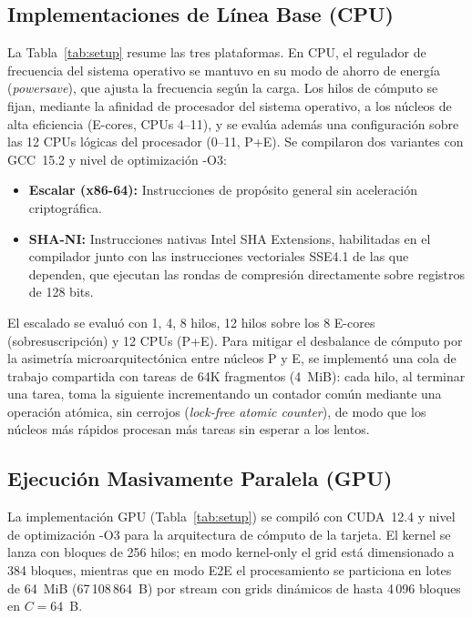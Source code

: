 \documentclass[conference]{IEEEtran}
\begin{document}


\subsection{Implementaciones de Línea Base (CPU)}
\label{sec:cpu_impl}

La Tabla~\ref{tab:setup} resume las tres plataformas. En CPU, el regulador de frecuencia del sistema operativo se mantuvo en su modo de ahorro de energía (\textit{powersave}), que ajusta la frecuencia según la carga. Los hilos de cómputo se fijan, mediante la afinidad de procesador del sistema operativo, a los núcleos de alta eficiencia (E-cores, CPUs 4--11), y se evalúa además una configuración sobre las 12 CPUs lógicas del procesador (0--11, P+E). Se compilaron dos variantes con GCC~15.2 y nivel de optimización -O3:
\begin{itemize}
    \item \textbf{Escalar (x86-64):} Instrucciones de propósito general sin aceleración criptográfica.
    \item \textbf{SHA-NI:} Instrucciones nativas Intel SHA Extensions, habilitadas en el compilador junto con las instrucciones vectoriales SSE4.1 de las que dependen, que ejecutan las rondas de compresión directamente sobre registros de 128 bits.
\end{itemize}
El escalado se evaluó con 1, 4, 8 hilos, 12 hilos sobre los 8 E-cores (sobresuscripción) y 12 CPUs (P+E). Para mitigar el desbalance de cómputo por la asimetría microarquitectónica entre núcleos P y E, se implementó una cola de trabajo compartida con tareas de 64K fragmentos (4~MiB): cada hilo, al terminar una tarea, toma la siguiente incrementando un contador común mediante una operación atómica, sin cerrojos (\textit{lock-free atomic counter}), de modo que los núcleos más rápidos procesan más tareas sin esperar a los lentos.

\subsection{Ejecución Masivamente Paralela (GPU)}

La implementación GPU (Tabla~\ref{tab:setup}) se compiló con CUDA~12.4 y nivel de optimización -O3 para la arquitectura de cómputo de la tarjeta. El kernel se lanza con bloques de 256 hilos; en modo kernel-only el grid está dimensionado a 384 bloques, mientras que en modo E2E el procesamiento se particiona en lotes de 64~MiB (67\,108\,864~B) por stream con grids dinámicos de hasta 4\,096 bloques en $C=64$~B.
\end{document}
